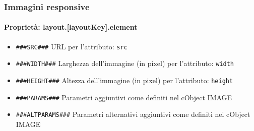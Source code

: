 
\begin{frame}[fragile]
	\frametitle{Immagini responsive}
	\framesubtitle{Proprietà: layout.[layoutKey].element}


	\begin{itemize}
			\item \lstinline!###SRC###!\newline
				URL per l'attributo: \texttt{src}

			\item \lstinline!###WIDTH###!\newline
				Larghezza dell'immagine (in pixel) per l'attributo: \texttt{width}

			\item \lstinline!###HEIGHT###!\newline
				Altezza dell'immagine (in pixel) per l'attributo: \texttt{height}

			\item \lstinline!###PARAMS###!\newline
				Parametri aggiuntivi come definiti nel cObject IMAGE

			\item \lstinline!###ALTPARAMS###!\newline
				Parametri alternativi aggiuntivi come definiti nel cObject IMAGE

	\end{itemize}

\end{frame}


